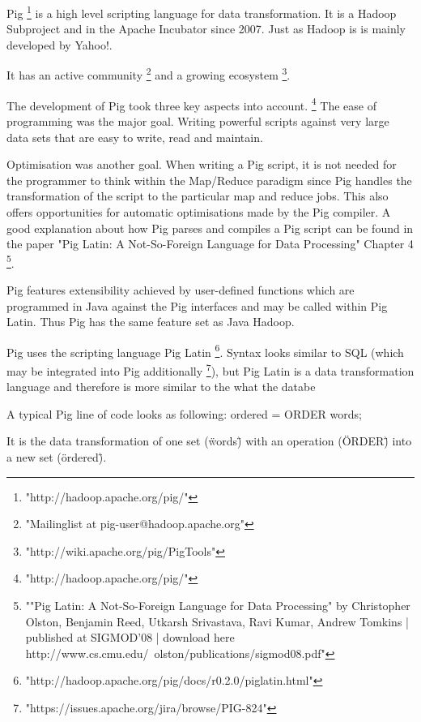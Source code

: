 Pig \footnote{"http://hadoop.apache.org/pig/"} is a high level scripting language for data transformation. It is a Hadoop Subproject and in the Apache Incubator since 2007. Just as Hadoop is is mainly developed by Yahoo!. 

It has an active community \footnote{"Mailinglist at pig-user@hadoop.apache.org"} and a growing ecosystem \footnote{"http://wiki.apache.org/pig/PigTools"}.

The development of Pig took three key aspects into account. \footnote{"http://hadoop.apache.org/pig/"} The ease of programming was the major goal. Writing powerful scripts against very large data sets that are easy to write, read and maintain.

Optimisation was another goal. When writing a Pig script, it is not needed for the programmer to think within the Map/Reduce paradigm since Pig handles the transformation of the script to the particular map and reduce jobs. This also offers opportunities for automatic optimisations made by the Pig compiler. A good explanation about how Pig parses and compiles a Pig script can be found in the paper "Pig Latin: A Not-So-Foreign Language for Data Processing" Chapter 4 \footnote{""Pig Latin: A Not-So-Foreign Language for Data Processing" by Christopher Olston, Benjamin Reed, Utkarsh Srivastava, Ravi Kumar, Andrew Tomkins | published at SIGMOD’08 | download here http://www.cs.cmu.edu/~olston/publications/sigmod08.pdf"}.

Pig features extensibility achieved by user-defined functions which are programmed in Java against the Pig interfaces and may be called within Pig Latin. Thus Pig has the same feature set as Java Hadoop.

Pig uses the scripting language Pig Latin \footnote{"http://hadoop.apache.org/pig/docs/r0.2.0/piglatin.html"}. Syntax looks similar to SQL (which may be integrated into Pig additionally \footnote{"https://issues.apache.org/jira/browse/PIG-824"}), but Pig Latin is a data transformation language and therefore is more similar to the what the databe  

A typical Pig line of code looks as following:
ordered = ORDER words;

It is the data transformation of one set (\"words\") with an operation (\"ORDER\") into a new set (\"ordered\").
                                                                                                               